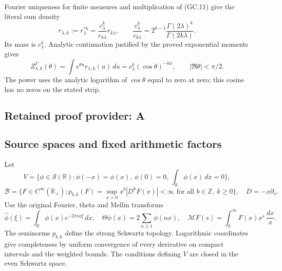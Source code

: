 \documentclass[11pt,a4paper]{article}
\begin{document}
Fourier uniqueness for finite measures and multiplication of (GC.11)
give the literal sum density
\[
 r_{\lambda,k}:=r_\lambda^{*k}
   =\frac{c_\lambda^k}{c_{k\lambda}}r_{k\lambda},\qquad
 \frac{c_\lambda^k}{c_{k\lambda}}
   =2^{k-1}\frac{\Gamma(2\lambda)^k}{\Gamma(2k\lambda)}.
                                                               \tag{GC.12}
\]
Its mass is $c_\lambda^k$. Analytic continuation justified by the
proved exponential moments gives
\[
 Z_{\lambda,k}^\Gamma(\theta)
 =\int e^{\theta u}r_{\lambda,k}(u)\,du
 =c_\lambda^k(\cos\theta)^{-k\alpha},
 \qquad |\Re\theta|<\pi/2.                                   \tag{GC.13}
\]
The power uses the analytic logarithm of $\cos\theta$ equal to zero
at zero; this cosine has no zeros on the stated strip.


\clearpage
\subsection*{Retained proof provider: A}

\subsection{Source spaces and fixed arithmetic factors}
Let
\[
 V=\{\phi\in\mathcal S(\mathbb R):\phi(-x)=\phi(x),\
          \phi(0)=0,\ \int_{\mathbb R}\phi(x)\,dx=0\},
\]
\[
 \mathscr B=\{F\in C^\infty(\mathbb R_+):
       p_{b,k}(F)=\sup_{x>0}x^b|D^kF(x)|<\infty
          \text{ for all }b\in\mathbb Z,\ k\geq0\},
 \quad D=-x\partial_x.
\]
Use the original Fourier, theta and Mellin transforms
\[
 \widehat\phi(\xi)=\int_{\mathbb R}\phi(x)e^{-2\pi ix\xi}\,dx,\quad
 \Theta\phi(x)=2\sum_{n\geq1}\phi(nx),\quad
 \mathcal MF(s)=\int_0^\infty F(x)x^s\,\frac{dx}{x}.
 \tag{A1}
\]
The seminorms \(p_{b,k}\) define the strong Schwartz topology.
Logarithmic coordinates give completeness by uniform convergence of
every derivative on compact intervals and the weighted bounds.
The conditions defining \(V\) are closed in the even Schwartz space.
\end{document}
